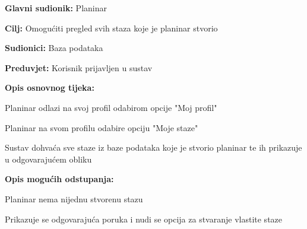 			\noindent {}
		\begin{packed_item}
			
			\item \textbf{Glavni sudionik: }$ $Planinar$ $
			\item  \textbf{Cilj:} $ $Omogućiti pregled svih staza koje je planinar stvorio$ $
			\item  \textbf{Sudionici:} $ $Baza podataka$ $
			\item  \textbf{Preduvjet:} $ $Korisnik prijavljen u sustav$ $
			\item  \textbf{Opis osnovnog tijeka:}
			
			\item[] \begin{packed_enum}
				\item $ $Planinar odlazi na svoj profil odabirom opcije "Moj profil"$ $
				\item $ $Planinar na svom profilu odabire opciju "Moje staze"$ $
				\item $ $Sustav dohvaća sve staze iz baze podataka koje je stvorio planinar te ih prikazuje u odgovarajućem obliku$ $
			\end{packed_enum}
		\item  \textbf{Opis mogućih odstupanja:}
			\item[] \begin{packed_item}
				
				\item[3.a] $ $Planinar nema nijednu stvorenu stazu$ $
				\item[] \begin{packed_enum}
					\item $ $Prikazuje se odgovarajuća poruka i nudi se opcija za stvaranje vlastite staze$ $
				\end{packed_enum}
			\end{packed_item}
		\end{packed_item}
	
